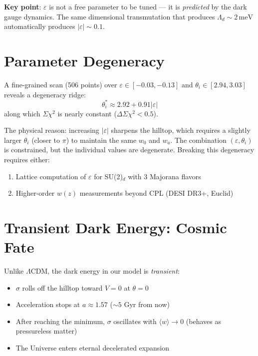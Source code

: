 \documentclass[11pt,a4paper]{article}
\newcommand{\Ld}{\Lambda_d}
\newcommand{\meV}{\,\mathrm{meV}}
\begin{document}
\medskip
\noindent
\textbf{Key point}: $\varepsilon$ is not a free parameter to be tuned --- it is \emph{predicted} 
by the dark gauge dynamics. The same dimensional transmutation that produces $\Ld \sim 2\meV$ 
automatically produces $|\varepsilon| \sim 0.1$.

\section{Parameter Degeneracy}
\label{sec:degeneracy}

A fine-grained scan (506 points) over $\varepsilon \in [-0.03, -0.13]$ and 
$\theta_i \in [2.94, 3.03]$ reveals a degeneracy ridge:
\begin{equation}
  \theta_i^* \approx 2.92 + 0.91|\varepsilon|
\end{equation}
along which $\Sigma\chi^2$ is nearly constant ($\Delta\Sigma\chi^2 < 0.5$).

The physical reason: increasing $|\varepsilon|$ sharpens the hilltop, 
which requires a slightly larger $\theta_i$ (closer to $\pi$) to maintain the same 
$w_0$ and $w_a$. The combination $(\varepsilon, \theta_i)$ is constrained, but the 
individual values are degenerate. Breaking this degeneracy requires either:
\begin{enumerate}[nosep]
  \item Lattice computation of $\varepsilon$ for SU(2)$_d$ with 3 Majorana flavors
  \item Higher-order $w(z)$ measurements beyond CPL (DESI DR3+, Euclid)
\end{enumerate}

\section{Transient Dark Energy: Cosmic Fate}
\label{sec:fate}

Unlike $\Lambda$CDM, the dark energy in our model is \emph{transient}:
\begin{itemize}[nosep]
  \item $\sigma$ rolls off the hilltop toward $V = 0$ at $\theta = 0$
  \item Acceleration stops at $a \approx 1.57$ ($\sim5$ Gyr from now)
  \item After reaching the minimum, $\sigma$ oscillates with $\langle w \rangle \to 0$ 
    (behaves as pressureless matter)
  \item The Universe enters eternal decelerated expansion
\end{itemize}
\end{document}
